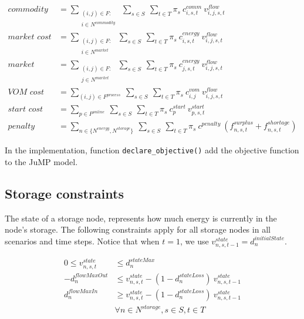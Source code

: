 \documentclass{article}
\begin{document}
\begin{align}
    \textit{commodity cost} & = \sum_{\substack{(i,j) \in F :\\ i \in N^{commodity}}} \ \sum_{s \in S} \ \sum_{t \in T}  \pi_s \ c^{comm}_{i, s, t} \ v^{flow}_{i, j, s, t}  \label{eq:commodity_costs}
    \\
    \textit{market cost} &= \sum_{\substack{(i,j) \in F: \\ i \in N^{market}}} \ \sum_{s \in S} \ \sum_{t \in T}   \pi_s \ c^{energy}_{i, s, t} \ v^{flow}_{i, j, s, t} \ \label{eq:market_costs}
    \\
    \textit{market profit} &= \sum_{\substack{(i,j) \in F: \\ j \in N^{market}}} \ \sum_{s \in S} \ \sum_{t \in T}  \pi_s \ c^{energy}_{j, s, t} \ v^{flow}_{i, j, s, t}  \label{eq:market_profit}
    \\
    \textit{VOM cost} &= \sum_{(i,j) \in F^{process}} \ \sum_{s \in S} \ \sum_{t \in T}  \pi_s \ c^{vom}_{i, j} \ v^{flow}_{i, j, s, t} \label{eq:vom_costs}
    \\
    \textit{start cost} &= \sum_{p \in P^{online}} \ \sum_{s \in S} \ \sum_{t \in T} \pi_s \  c^{start}_{p} \ v^{start}_{p, s, t} \label{eq:start_costs}
    \\
    \textit{penalty cost} &= \sum_{n \in \{N^{energy}, N^{storage}\}} \ \sum_{s \in S} \ \sum_{t \in T}  \pi_s \ c^{penalty} \ (f^{surplus}_{n, s, t} + f^{shortage}_{n, s, t}) \label{eq:penalty_costs}
\end{align} 

In the implementation, function \texttt{declare\_objective()} add the objective function to the JuMP model.




\subsection{Storage constraints}
The state of a storage node, represents how much energy is currently in the node’s storage. The following constraints apply for all storage nodes in all scenarios and time steps. Notice that when $t=1$, we use $v^{state}_{n, s, t-1} = d^{initialState}_n$. 

\begin{align}
    0 \leq v^{state}_{n, s, t} &\leq d^{stateMax}_n \label{eq:stateMax} \\[0.5cm]
     -d^{flowMaxOut}_n &\leq v^{state}_{n, s, t} - (1-d^{stateLoss}_{n}) \ v^{state}_{n, s, t-1}  \label{eq:discharging}\\[0.5cm]
      d^{flowMaxIn}_n &\geq v^{state}_{n, s, t} - (1-d^{stateLoss}_{n}) \ v^{state}_{n, s, t-1} \label{eq:charging} \\[0.5cm]
      &\forall n \in N^{storage}, s \in S, t\in T  \nonumber
\end{align}
\end{document}
